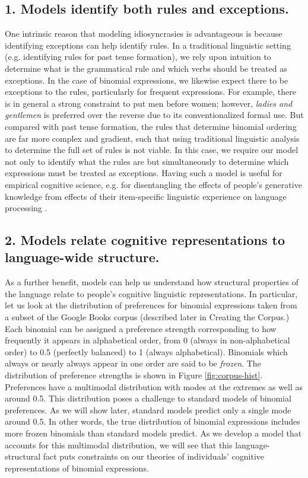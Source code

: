 \documentclass[10pt,letterpaper]{article}
\begin{document}
\subsection{1. Models identify both rules and exceptions.}
One intrinsic reason that modeling idiosyncrasies is advantageous is because identifying exceptions can help identify rules. In a traditional linguistic setting (e.g. identifying rules for past tense formation), we rely upon intuition to determine what is the grammatical rule and which verbs should be treated as exceptions. In the case of binomial expressions, we likewise expect there to be exceptions to the rules, particularly for frequent expressions. For example, there is in general a strong constraint to put men before women; however, \emph{ladies and gentlemen} is preferred over the reverse due to its conventionalized formal use. But compared with past tense formation, the rules that determine binomial ordering are far more complex and gradient, such that using traditional linguistic analysis to determine the full set of rules is not viable. In this case, we require our model not only to identify what the rules are but simultaneously to determine which expressions must be treated as exceptions. Having such a model is useful for empirical cognitive science, e.g. for disentangling the effects of people's generative knowledge from effects of their item-specific linguistic experience on language processing \citep{Morgan:uMm0l0Ja}.

\subsection{2. Models relate cognitive representations to language-wide structure.}
As a further benefit, models can help us understand how structural properties of the language relate to people's cognitive linguistic representations. In particular, let us look at the distribution of preferences for binomial expressions taken from a subset of the Google Books corpus (described later in Creating the Corpus.) Each binomial can be assigned a preference strength corresponding to how frequently it appears in alphabetical order, from 0 (always in non-alphabetical order) to 0.5 (perfectly balanced) to 1 (always alphabetical). Binomials which always or nearly always appear in one order are said to be \emph{frozen}. The distribution of preference strengths is shown in Figure \ref{fig:corpus-hist}. Preferences have a multimodal distribution with modes at the extremes as well as around 0.5. This distribution poses a challenge to standard models of binomial preferences. As we will show later, standard models predict only a single mode around 0.5. In other words, the true distribution of binomial expressions includes more frozen binomials than standard models predict. As we develop a model that accounts for this multimodal distribution, we will see that this language-structural fact puts constraints on our theories of individuals' cognitive representations of binomial expressions.
\end{document}
